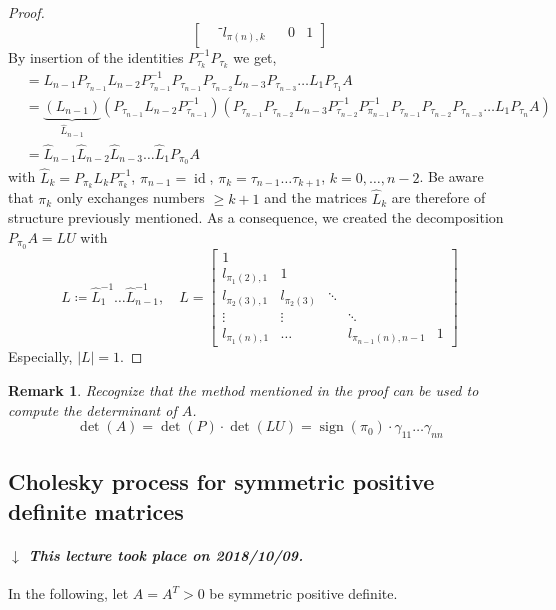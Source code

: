 \documentclass[a4paper]{article}
\newcounter{lecref}[section]
\numberwithin{lecref}{section}
\theoremstyle{break}
\newtheorem{remark}[lecref]{Remark}
\newcommand{\dateref}[1]{%
  \begin{mdframed}[backgroundcolor=gray!10,innerbottommargin=0pt,innertopmargin=0pt]
    \paragraph{\textit{$\downarrow$ This lecture took place on #1.}}%
  \end{mdframed}%
}
\newcommand{\Abs}[1]{\left|#1\right|}
\DeclareMathOperator{\sign}{sign}
\begin{document}
\begin{proof}
\[\begin{bmatrix}
        & ⁻l_{\pi(n),k}    &   & 0      & 1
    \end{bmatrix}
  \]
  By insertion of the identities $P_{\tau_k}^{-1} P_{\tau_k}$ we get,
  \begin{align*}
     &= L_{n-1} P_{\tau_{n-1}} L_{n-2} P_{\tau_{n-1}}^{-1} P_{\tau_{n-1}} P_{\tau_{n-2}} L_{n-3} P_{\tau_{n-3}} \dots L_1 P_{\tau_1} A \\
     &= \underbrace{(L_{n-1})}_{\hat L_{n-1}} (P_{\tau_{n-1}} L_{n-2} P_{\tau_{n-1}}^{-1}) (P_{\tau_{n-1}} P_{\tau_{n-2}} L_{n-3} P_{\tau_{n-2}}^{-1} P_{\pi_{n-1}}^{-1} P_{\tau_{n-1}} P_{\tau_{n-2}} P_{\tau_{n-3}} \dots L_1 P_{\tau_n} A) \\
     &= \hat L_{n-1} \hat L_{n-2} \hat L_{n-3} \dots \hat L_1 P_{\pi_0} A
  \end{align*}
  with $\hat L_k = P_{\pi_k} L_k P_{\pi_k}^{-1}$, $\pi_{n-1} = \operatorname{id}$, $\pi_k = \tau_{n-1} \dots \tau_{k+1}$, $k = 0, \dots, n-2$.
  Be aware that $\pi_k$ only exchanges numbers $\geq k+1$ and the matrices $\hat L_k$ are therefore of structure previously mentioned.
  As a consequence, we created the decomposition $P_{\pi_0} A = LU$ with
  \[
    L \coloneqq \hat L_1^{-1} \dots \hat L_{n-1}^{-1}, \quad
    L = \begin{bmatrix}
      1              &              &        & \\
      l_{\pi_1(2),1} & 1            &        &  \\
      l_{\pi_2(3),1} & l_{\pi_2(3)} & \ddots & \\
      \vdots         & \vdots       &        & \ddots \\
      l_{\pi_1(n),1} & \dots        &        & l_{\pi_{n-1}(n), n-1} & 1
    \end{bmatrix}
  \]
  Especially, $\Abs{L} = 1$.
\end{proof}

\begin{remark}
  Recognize that the method mentioned in the proof can be used to compute the determinant of $A$.
  \[ \det(A) = \det(P) \cdot \det(LU) = \sign(\pi_0) \cdot \gamma_{11} \dots \gamma_{nn} \]
\end{remark}

\subsection{Cholesky process for symmetric positive definite matrices}
\label{ch:1-4}

\dateref{2018/10/09}
In the following, let $A = A^T > 0$ be symmetric positive definite.
\end{document}
